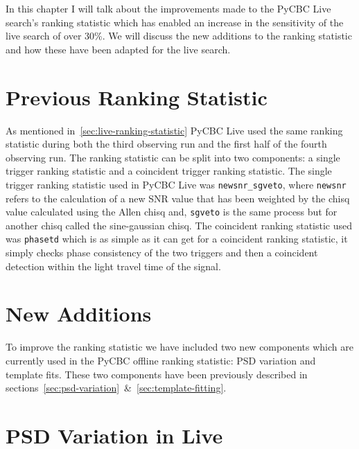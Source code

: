 
In this chapter I will talk about the improvements made to the PyCBC Live search's ranking statistic which has enabled an increase in the sensitivity of the live search of over 30\%. We will discuss the new additions to the ranking statistic and how these have been adapted for the live search.

\section{\label{live-previous-stat}Previous Ranking Statistic}

As mentioned in~\ref{sec:live-ranking-statistic} PyCBC Live used the same ranking statistic during both the third observing run and the first half of the fourth observing run. The ranking statistic can be split into two components: a single trigger ranking statistic and a coincident trigger ranking statistic. The single trigger ranking statistic used in PyCBC Live was \verb|newsnr_sgveto|, where \verb|newsnr| refers to the calculation of a new SNR value that has been weighted by the chisq value calculated using the Allen chisq and, \verb|sgveto| is the same process but for another chisq called the sine-gaussian chisq. The coincident ranking statistic used was \verb|phasetd| which is as simple as it can get for a coincident ranking statistic, it simply checks phase consistency of the two triggers and then a coincident detection within the light travel time of the signal.

\section{\label{live-new-additions}New Additions}

To improve the ranking statistic we have included two new components which are currently used in the PyCBC offline ranking statistic: PSD variation and template fits. These two components have been previously described in sections~\ref{sec:psd-variation}~\&~\ref{sec:template-fitting}.

\section{\label{live-psd-var}PSD Variation in Live}

